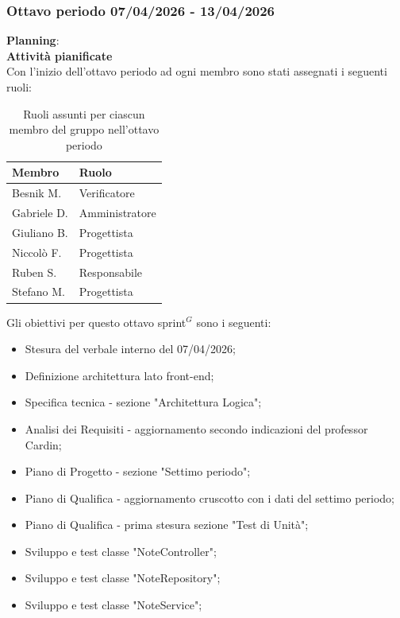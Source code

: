\documentclass[a4paper,10pt]{article}
\begin{document}
\subsubsection{Ottavo periodo 07/04/2026 - 13/04/2026}
\textbf{Planning}: \\
\textbf{Attività pianificate} \\ Con l'inizio dell'ottavo periodo ad ogni membro sono stati assegnati i seguenti ruoli:
\begin{table}[H]
\centering
\begin{tabular}{|l|l|}
\hline
\textbf{Membro} & \textbf{Ruolo} \\
\hline
Besnik M.  & Verificatore \\
\hline
Gabriele D.  & Amministratore \\
\hline
Giuliano B. & Progettista \\
\hline
Niccolò F. & Progettista \\
\hline
Ruben S. & Responsabile \\
\hline
Stefano M.  & Progettista \\
\hline
\end{tabular}
\caption{Ruoli assunti per ciascun membro del gruppo nell'ottavo periodo}
\end{table}

Gli obiettivi per questo ottavo sprint$^G$ sono i seguenti:
\begin{itemize}
  \item Stesura del verbale interno del 07/04/2026;
  \item Definizione architettura lato front-end;
  \item Specifica tecnica - sezione "Architettura Logica";
  \item Analisi dei Requisiti - aggiornamento secondo indicazioni del professor Cardin;
  \item Piano di Progetto - sezione "Settimo periodo";
  \item Piano di Qualifica - aggiornamento cruscotto con i dati del settimo periodo;
  \item Piano di Qualifica - prima stesura sezione "Test di Unità";
  \item Sviluppo e test classe "NoteController";
  \item Sviluppo e test classe "NoteRepository";
  \item Sviluppo e test classe "NoteService";
\end{itemize}
\end{document}
